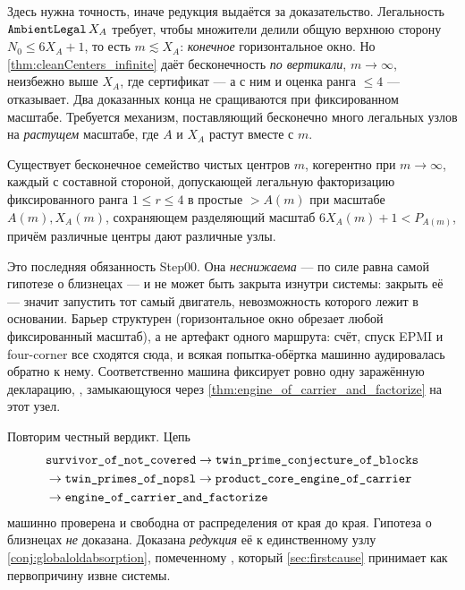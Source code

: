 Здесь нужна точность, иначе редукция выдаётся за доказательство. Легальность
$\texttt{AmbientLegal}\,X_A$ требует, чтобы множители делили общую верхнюю сторону $N_0\le6X_A+1$, то
есть $m\lesssim X_A$: \emph{конечное} горизонтальное окно. Но \cref{thm:cleanCenters_infinite} даёт
бесконечность \emph{по вертикали}, $m\to\infty$, неизбежно выше $X_A$, где сертификат --- а с ним и
оценка ранга $\le4$ --- отказывает. Два доказанных конца не сращиваются при фиксированном масштабе.
Требуется механизм, поставляющий бесконечно много легальных узлов на \emph{растущем} масштабе, где
$A$ и $X_A$ растут вместе с $m$.

\begin{conjecture}\label{conj:globaloldabsorption}
\red{} Существует бесконечное семейство чистых центров $m$, когерентно при $m\to\infty$, каждый с
составной стороной, допускающей легальную факторизацию фиксированного ранга $1\le r\le4$ в простые
$>A(m)$ при масштабе $A(m),X_A(m)$, сохраняющем разделяющий масштаб $6X_A(m)+1<P_{A(m)}$, причём
различные центры дают различные узлы.
\end{conjecture}

Это последняя обязанность Step00. Она \emph{неснижаема} --- по силе равна самой гипотезе о близнецах
--- и не может быть закрыта изнутри системы: закрыть её --- значит запустить тот самый двигатель,
невозможность которого лежит в основании. Барьер структурен (горизонтальное окно обрезает любой
фиксированный масштаб), а не артефакт одного маршрута: счёт, спуск EPMI и four-corner все сходятся
сюда, и всякая попытка-обёртка машинно аудировалась обратно к нему. Соответственно машина фиксирует
ровно одну заражённую  декларацию, , замыкающуюся через
\cref{thm:engine_of_carrier_and_factorize} на этот узел.

\begin{remark}
Повторим честный вердикт. Цепь
\[
\begin{aligned}
  &\texttt{survivor\_of\_not\_covered}\to\texttt{twin\_prime\_conjecture\_of\_blocks}\\
  &\to\texttt{twin\_primes\_of\_nopsl}\to\texttt{product\_core\_engine\_of\_carrier}\\
  &\to\texttt{engine\_of\_carrier\_and\_factorize}
\end{aligned}
\]
\green{} машинно проверена и свободна от распределения от края до края. Гипотеза о близнецах
\emph{не} доказана. Доказана \emph{редукция} её к единственному узлу
\cref{conj:globaloldabsorption}, помеченному \red{}, который \cref{sec:firstcause} принимает как
первопричину \axiom{} извне системы.
\end{remark}
